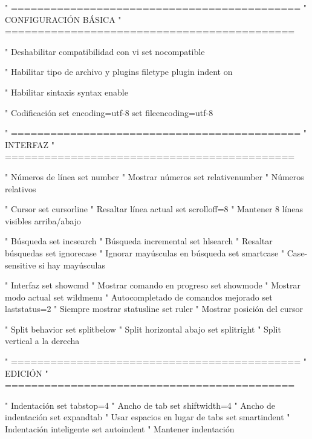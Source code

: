 \documentclass[
  doc,
  floatsintext,
  longtable,
  a4paper,
  nolmodern,
  notxfonts,
  notimes,
  12pt,
  colorlinks=true,linkcolor=blue,citecolor=blue,urlcolor=blue]{apa7}
\newenvironment{Shaded}{\begin{snugshade}}{\end{snugshade}}
\newcommand{\NormalTok}[1]{\textcolor[rgb]{0.00,0.23,0.31}{#1}}
\begin{document}
\begin{Shaded}
\begin{Highlighting}[]
\NormalTok{" ============================================}
\NormalTok{" CONFIGURACIÓN BÁSICA}
\NormalTok{" ============================================}

\NormalTok{" Deshabilitar compatibilidad con vi}
\NormalTok{set nocompatible}

\NormalTok{" Habilitar tipo de archivo y plugins}
\NormalTok{filetype plugin indent on}

\NormalTok{" Habilitar sintaxis}
\NormalTok{syntax enable}

\NormalTok{" Codificación}
\NormalTok{set encoding=utf{-}8}
\NormalTok{set fileencoding=utf{-}8}

\NormalTok{" ============================================}
\NormalTok{" INTERFAZ}
\NormalTok{" ============================================}

\NormalTok{" Números de línea}
\NormalTok{set number          " Mostrar números}
\NormalTok{set relativenumber  " Números relativos}

\NormalTok{" Cursor}
\NormalTok{set cursorline      " Resaltar línea actual}
\NormalTok{set scrolloff=8     " Mantener 8 líneas visibles arriba/abajo}

\NormalTok{" Búsqueda}
\NormalTok{set incsearch       " Búsqueda incremental}
\NormalTok{set hlsearch        " Resaltar búsquedas}
\NormalTok{set ignorecase      " Ignorar mayúsculas en búsqueda}
\NormalTok{set smartcase       " Case{-}sensitive si hay mayúsculas}

\NormalTok{" Interfaz}
\NormalTok{set showcmd         " Mostrar comando en progreso}
\NormalTok{set showmode        " Mostrar modo actual}
\NormalTok{set wildmenu        " Autocompletado de comandos mejorado}
\NormalTok{set laststatus=2    " Siempre mostrar statusline}
\NormalTok{set ruler           " Mostrar posición del cursor}

\NormalTok{" Split behavior}
\NormalTok{set splitbelow      " Split horizontal abajo}
\NormalTok{set splitright      " Split vertical a la derecha}

\NormalTok{" ============================================}
\NormalTok{" EDICIÓN}
\NormalTok{" ============================================}

\NormalTok{" Indentación}
\NormalTok{set tabstop=4       " Ancho de tab}
\NormalTok{set shiftwidth=4    " Ancho de indentación}
\NormalTok{set expandtab       " Usar espacios en lugar de tabs}
\NormalTok{set smartindent     " Indentación inteligente}
\NormalTok{set autoindent      " Mantener indentación}


\end{Highlighting}
\end{Shaded}
\end{document}
